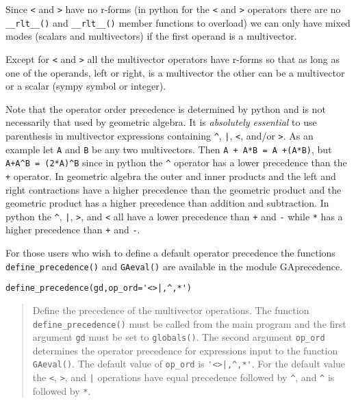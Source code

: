 \documentclass[10pt]{article}
\newcommand{\T}[1]{\texttt{#1}}
\begin{document}
Since \T{<} and \T{>} have no r-forms (in python for the \T{<} and \T{>} operators there are no \lstinline$__rlt__()$ and
 \lstinline$__rlt__()$ member functions to overload)
we can only have mixed modes (scalars and multivectors) if the first operand is a multivector.


    Except for \T{<} and \T{>} all the multivector operators have r-forms so that as long as one of the
    operands, left or right, is a multivector the other can be a multivector or a scalar (sympy symbol or integer).

    Note that the operator order precedence is determined by python and is not
    necessarily that used by geometric algebra. It is \emph{absolutely essential} to
    use parenthesis in multivector
    expressions containing \T{\^}, \T{|}, \T{<}, and/or \T{>}.  As an example let
    \T{A} and \T{B} be any two multivectors. Then \T{A + A*B = A +(A*B)}, but
    \lstinline!A+A^B = (2*A)^B! since in python the \T{\^} operator has a lower precedence
    than the \T{+} operator.  In geometric algebra the outer and inner products and
    the left and right contractions have a higher precedence than the geometric
    product and the geometric product has a higher precedence than addition and
    subtraction.  In python the \T{\^}, \T{|}, \T{>}, and \T{<} all have a lower
    precedence than \T{+} and \T{-} while \T{*} has a higher precedence than
    \T{+} and \T{-}.

For those users who wish to define a default operator precedence the functions
\T{define\_precedence()} and \T{GAeval()} are available in the module GAprecedence.

   \lstinline$define_precedence(gd,op_ord='<>|,^,*')$
   \begin{quote}
   Define the precedence of the multivector operations.  The function
   \T{define\_precedence()} must be called from the main program and the
   first argument \T{gd} must be set to \T{globals()}.  The second argument
   \T{op\_ord} determines the operator precedence for expressions input to
   the function \T{GAeval()}. The default value of \T{op\_ord} is \lstinline$'<>|,^,*'$.
   For the default value the \T{<}, \T{>}, and \T{|} operations have equal
   precedence followed by \T{\^}, and \T{\^} is followed by \T{*}.
   \end{quote}
  
\end{document}
